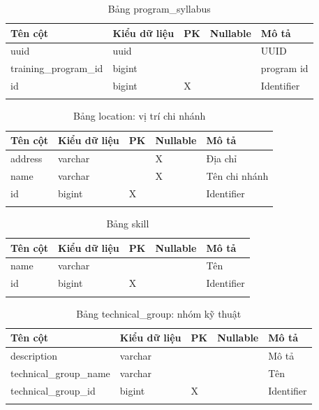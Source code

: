 \documentclass[report.tex]{subfiles}
\begin{document}
\begin{table}[!htb]
\begin{longtable}{|p{3cm}|p{3cm}|p{1cm}|p{1.6cm}|p{6cm}|}
\hline
\textbf{Tên cột} & \textbf{Kiểu dữ liệu} & \textbf{PK} & \textbf{Nullable} & \textbf{Mô tả} \\
\hline
uuid & uuid & & & UUID \\
training\_program\_id & bigint & & & program id \\
id & bigint & X & & Identifier \\
\hline
\caption[Bảng program\_syllabus]{Bảng program\_syllabus}
\end{longtable}
\end{table}
\FloatBarrier

\begin{table}[!htb]
\begin{longtable}{|p{3cm}|p{3cm}|p{1cm}|p{1.6cm}|p{6cm}|}
\hline
\textbf{Tên cột} & \textbf{Kiểu dữ liệu} & \textbf{PK} & \textbf{Nullable} & \textbf{Mô tả} \\
\hline
address & varchar & & X & Địa chỉ \\
name & varchar & & X & Tên chi nhánh \\
id & bigint & X & & Identifier \\
\hline
\caption[Bảng location]{Bảng location: vị trí chi nhánh}
\end{longtable}
\end{table}
\FloatBarrier

\begin{table}[!htb]
\begin{longtable}{|p{3cm}|p{3cm}|p{1cm}|p{1.6cm}|p{6cm}|}
\hline
\textbf{Tên cột} & \textbf{Kiểu dữ liệu} & \textbf{PK} & \textbf{Nullable} & \textbf{Mô tả} \\
\hline
name & varchar & & & Tên \\
id & bigint & X & & Identifier \\
\hline
\caption[Bảng skill]{Bảng skill}
\end{longtable}
\end{table}
\FloatBarrier


\begin{table}[!htb]
\begin{longtable}{|p{3cm}|p{3cm}|p{1cm}|p{1.6cm}|p{6cm}|}
\hline
\textbf{Tên cột} & \textbf{Kiểu dữ liệu} & \textbf{PK} & \textbf{Nullable} & \textbf{Mô tả} \\
\hline
description & varchar & & & Mô tả \\
technical\_group\_name & varchar & & & Tên \\
technical\_group\_id & bigint & X & & Identifier \\
\hline
\caption[Bảng technical\_group]{Bảng technical\_group: nhóm kỹ thuật}
\end{longtable}
\end{table}
\FloatBarrier
\end{document}
